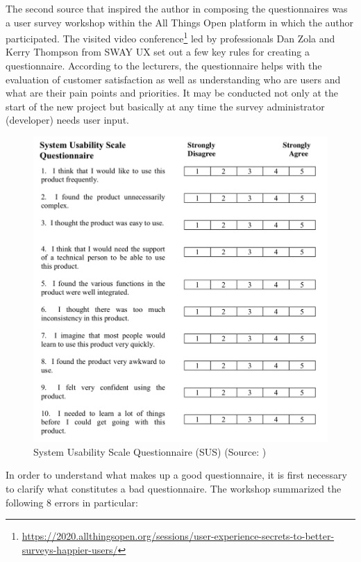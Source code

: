 \documentclass[a4paper,10pt,twoside]{article}
\begin{document}
The second source that inspired the author in composing the
questionnaires was a user survey workshop within the All Things Open
platform in which the author participated. The visited video
conference\footnote{\url{https://2020.allthingsopen.org/sessions/user-experience-secrets-to-better-surveys-happier-users/}}
led by professionals Dan Zola and Kerry Thompson from SWAY UX set out
a few key rules for creating a questionnaire. According to the
lecturers, the questionnaire helps with the evaluation of customer
satisfaction as well as understanding who are users and what are their
pain points and priorities. It may be conducted not only at the start
of the new project but basically at any time the survey administrator
(developer) needs user input.

\vspace{0.3cm}
\begin{figure}[hbt!] 
\begin{center}
\includegraphics[width=14cm]{../pictures/sus.png} 
\caption[System Usability Scale Questionnaire (SUS) ]{System Usability Scale Questionnaire (SUS) (Source: \cite{sus})}
\label{fig:sus}
\end{center}
\end{figure}

\newpage
\noindent In order to understand what makes up a good questionnaire,
it is first necessary to clarify what constitutes a bad
questionnaire. The workshop summarized the following 8 errors in
particular:
\end{document}
